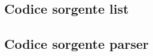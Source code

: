 \documentclass[a4paper]{article}
\begin{document}
\subsection{Codice sorgente list}


\subsection{Codice sorgente parser}


\pagebreak
\lstlistoflistings
\end{document}
